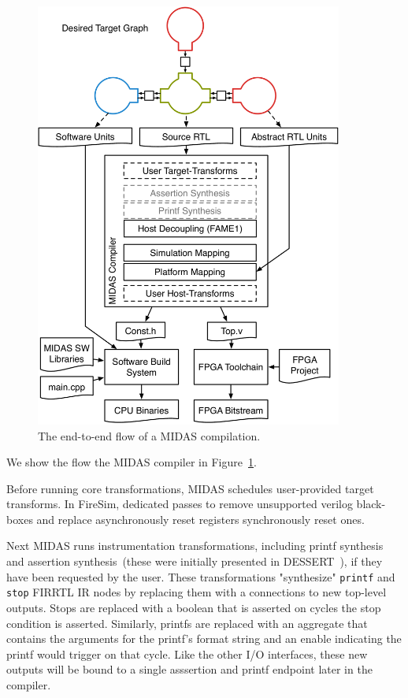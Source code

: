 \begin{figure}
    \centering
    \includegraphics[width=0.9\textwidth]{figures/midas-flow.pdf}
    \caption{The end-to-end flow of a MIDAS compilation.}
    \label{fig:midas-flow}
\end{figure}

We show the flow the MIDAS compiler in Figure~\ref{fig:midas-flow}.

Before running core transformations, MIDAS schedules user-provided target transforms.
In FireSim, dedicated passes to remove unsupported verilog black-boxes and
replace asynchronously reset registers synchronously reset ones.

Next MIDAS runs instrumentation transformations, including printf synthesis
and assertion synthesis~(these were initially presented in DESSERT~\cite{DESSERT}), if they have been requested by the user. These
transformations "synthesize" \texttt{printf} and \texttt{stop} FIRRTL IR
nodes by replacing them with a connections to new top-level outputs. Stops are
replaced with a boolean that is asserted on cycles the stop condition is asserted. Similarly, printfs are replaced with an aggregate that contains
the arguments for the printf's format string and an enable indicating the
printf would trigger on that cycle. Like the other I/O interfaces, these new outputs will be bound to a single asssertion
and printf endpoint later in the compiler.


